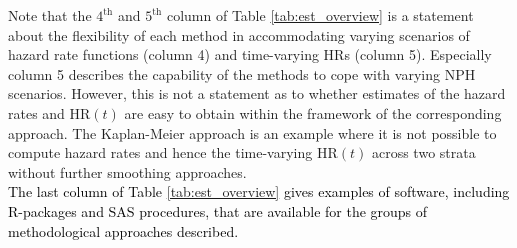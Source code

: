 \documentclass{article}
\newcommand{\NEW}[2][black]{\textcolor{#1}{#2}}
\begin{document}
\noindent Note that the $4^{\text{th}}$ and $5^{\text{th}}$ column of Table \ref{tab:est_overview} is a statement about the flexibility of each method in accommodating varying scenarios of hazard rate functions (column 4) and time-varying HRs (column 5). Especially column 5 describes the capability of the methods to cope with varying NPH scenarios.
However, this is not a statement as to whether estimates of the hazard rates and $\text{HR}(t)$ are easy to obtain within the framework of the corresponding approach.
The Kaplan-Meier approach is an example where it is not possible to compute hazard rates and hence the time-varying $\text{HR}(t)$ across two strata without further smoothing approaches.\\
\NEW{The last column of Table \ref{tab:est_overview} gives examples of software, including R-packages and SAS procedures, that are available for the groups of methodological approaches described.
}
\end{document}
